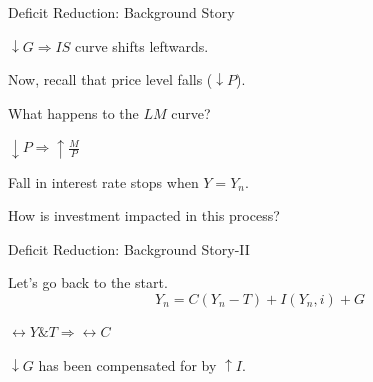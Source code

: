 \documentclass[shownotes,11pt, aspectratio=169]{beamer}
\newenvironment{wideitemize}{\itemize\addtolength{\itemsep}{10pt}}{\enditemize}
\begin{document}
\begin{frame}
\end{frame}

\begin{frame}{Deficit Reduction: Background Story}
\begin{wideitemize}
\item $\downarrow G \Rightarrow IS$ curve shifts leftwards. \pause
\item Now, recall that price level falls ($\downarrow P$). \pause 
\item What happens to the $LM$ curve? \pause
\item $\downarrow P \Rightarrow \uparrow \frac{M}{P}$
\item Fall in interest rate stops when $Y = Y_n$.
\pause
\item How is investment impacted in this process? 
\end{wideitemize}
\end{frame}

\begin{frame}{Deficit Reduction: Background Story-II}
\begin{wideitemize}
\item Let's go back to the start. 
      \begin{equation*} Y_n = C(Y_n - T) + I(Y_n,i) + G \end{equation*}
\item $\leftrightarrow Y \text{\&} T \Rightarrow \leftrightarrow C$
\item $\downarrow G$ has been compensated for by $\uparrow I$.
\end{wideitemize}
\end{frame}
\end{document}
